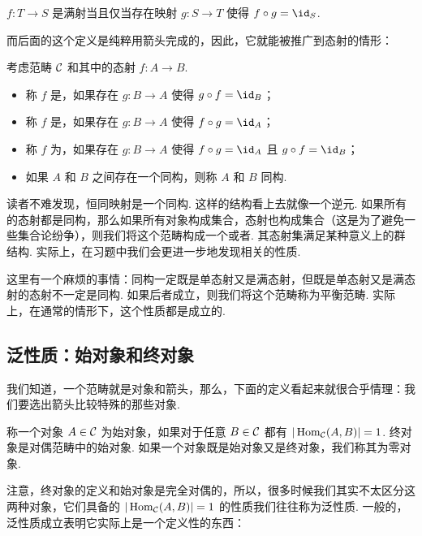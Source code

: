 \begin{lemma}{}{}
    $f\colon T \to S$ 是满射当且仅当存在映射 $g\colon S \to T$ 使得 $f \circ g = \id_S$.
\end{lemma}

而后面的这个定义是纯粹用箭头完成的，因此，它就能被推广到态射的情形：

\begin{definition}{}{}
    考虑范畴 $\mathcal{C}$ 和其中的态射 $f\colon A \to B$.
    \begin{itemize}
        \item 称 $f$ 是，如果存在 $g\colon B \to A$ 使得 $g \circ f = \id_B$；
        \item 称 $f$ 是，如果存在 $g\colon B \to A$ 使得 $f \circ g = \id_A$；
        \item 称 $f$ 为，如果存在 $g\colon B \to A$ 使得 $f \circ g = \id_A$ 且 $g \circ f = \id_B$；
        \item 如果 $A$ 和 $B$ 之间存在一个同构，则称 $A$ 和 $B$ 同构.
    \end{itemize}
\end{definition}

读者不难发现，恒同映射是一个同构. 这样的结构看上去就像一个逆元. 如果所有的态射都是同构，那么如果所有对象构成集合，态射也构成集合（这是为了避免一些集合论纷争），则我们将这个范畴构成一个或者. 其态射集满足某种意义上的群结构. 实际上，在习题中我们会更进一步地发现相关的性质.

这里有一个麻烦的事情：同构一定既是单态射又是满态射，但既是单态射又是满态射的态射不一定是同构. 如果后者成立，则我们将这个范畴称为平衡范畴. 实际上，在通常的情形下，这个性质都是成立的.

\subsection{泛性质：始对象和终对象}

我们知道，一个范畴就是对象和箭头，那么，下面的定义看起来就很合乎情理：我们要选出箭头比较特殊的那些对象.

\begin{definition}{}{}
    称一个对象 $A \in \mathcal{C}$ 为始对象，如果对于任意 $B \in \mathcal{C}$ 都有 $|\operatorname{Hom}_{\mathcal{C}} (A, B)| = 1$. 终对象是对偶范畴中的始对象. 如果一个对象既是始对象又是终对象，我们称其为零对象.
\end{definition}

注意，终对象的定义和始对象是完全对偶的，所以，很多时候我们其实不太区分这两种对象，它们具备的 $|\operatorname{Hom}_{\mathcal{C}} (A, B)| = 1$ 的性质我们往往称为泛性质. 一般的，泛性质成立表明它实际上是一个定义性的东西：

